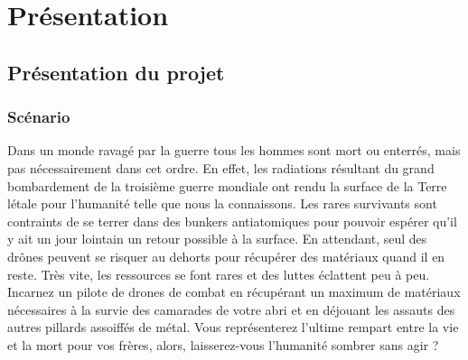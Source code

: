﻿\documentclass[12pt]{article}
\begin{document}
\section{Présentation}
\subsection{Présentation du projet}
\subsubsection{Scénario}
Dans un monde ravagé par la guerre tous les hommes sont mort ou
enterrés, mais pas nécessairement dans cet ordre. En effet, les
radiations résultant du grand bombardement de la troisième guerre
mondiale ont rendu la surface de la Terre létale pour l'humanité
telle que nous la connaissons. Les rares survivants sont contraints
de se terrer dans des bunkers antiatomiques pour pouvoir
espérer qu'il y ait un jour lointain un retour possible à la
surface. En attendant, seul des drônes peuvent se risquer au dehorts
pour récupérer des matériaux quand il en reste. Très vite, les
ressources se font rares et des luttes éclattent peu à peu. Incarnez
un pilote de drones de combat en récupérant un maximum de matériaux
nécessaires à la survie des camarades de votre abri et en déjouant
les assauts des autres pillards assoiffés de métal. Vous représenterez
l'ultime rempart entre la vie et la mort pour vos frères, alors,
laisserez-vous l'humanité sombrer sans agir ?
\end{document}
